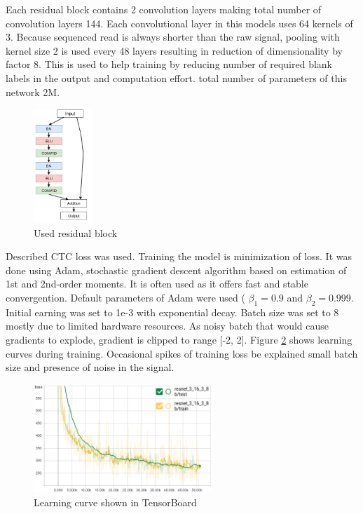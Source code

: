 \documentclass[times, utf8, diplomski, numeric, english]{fer}
\begin{document}
Each residual block contains 2 convolution layers making total number of convolution layers 144. Each convolutional layer in this models uses 64 kernels of 3. Because  sequenced read is always shorter than the raw signal, pooling with kernel size 2 is used every 48 layers resulting in reduction of dimensionality by factor 8. This is used to help training by reducing number of required blank labels in the output and computation effort. total number of parameters of this network 2M.


\begin{figure}[!ht]
	\begin{center}
		\includegraphics[width=0.2\textwidth]{./imgs/model.png}
		\caption{Used residual block}
		\label{fg:model_block}
	\end{center}
\end{figure}


Described CTC loss was used. Training the model is minimization of loss. It was done using Adam, stochastic gradient descent algorithm based on estimation of 1st and 2nd-order moments.
It is often used as it offers fast and stable convergention. Default parameters of Adam were used (
$\beta_1=0.9$ and $\beta_2=0.999$. Initial earning was set to 1e-3 with exponential decay. Batch size was set to 8 mostly due to limited hardware resources. As noisy batch that would cause gradients to explode, gradient is clipped to range [-2, 2].
Figure \ref{fg:learn} shows learning curves during training. Occasional spikes of training loss be explained small batch size and presence of noise in the signal.


\begin{figure}[!ht]
	\begin{center}
		\includegraphics[width=0.6\textwidth]{./imgs/train_tb.png}
		\caption{Learning curve shown in TensorBoard}
		\label{fg:learn}
	\end{center}
\end{figure}
\end{document}
